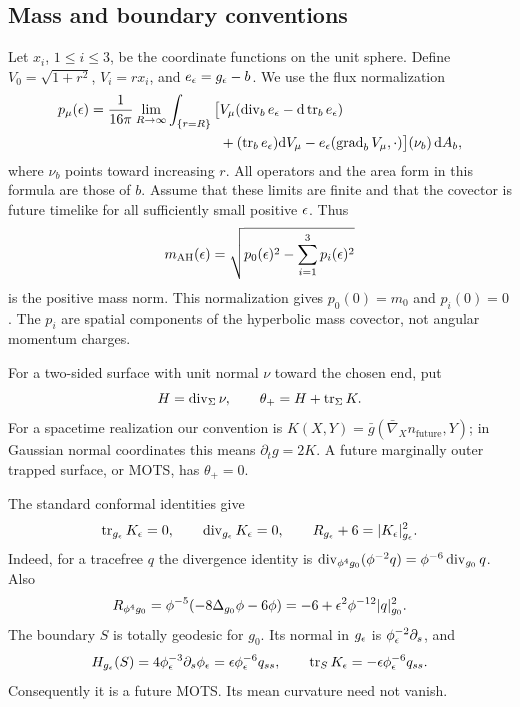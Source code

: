 \subsection{Mass and boundary conventions}

Let $x_i$, $1\leq i\leq3$, be the coordinate functions on the unit
sphere. Define $V_0=\sqrt{1+r^2}$, $V_i=rx_i$, and
$e_\epsilon=g_\epsilon-b$. We use the flux normalization
\begin{equation}\label{eq:mass-flux}
\begin{split}
 p_\mu(\epsilon)=\frac1{16\pi}\lim_{R\to\infty}
 \int_{\{r=R\}}\big[
 &V_\mu(\operatorname{div}_b e_\epsilon-\mathrm{d}\operatorname{tr}_b e_\epsilon)\\
 &+(\operatorname{tr}_b e_\epsilon)\mathrm{d} V_\mu
      -e_\epsilon(\operatorname{grad}_bV_\mu,\cdot)
 \big](\nu_b)\,\mathrm{d} A_b ,
\end{split}
\end{equation}
where $\nu_b$ points toward increasing $r$. All operators and the
area form in this formula are those of $b$. Assume that these
limits are finite and that the covector is future timelike for
all sufficiently small positive $\epsilon$. Thus
\[
 m_{\mathrm{AH}}(\epsilon)=\sqrt{p_0(\epsilon)^2-\sum_{i=1}^3p_i(\epsilon)^2}
\]
is the positive mass norm. This normalization gives $p_0(0)=m_0$
and $p_i(0)=0$. The $p_i$ are spatial components of the hyperbolic
mass covector, not angular momentum charges.

For a two-sided surface with unit normal $\nu$ toward the chosen
end, put
\[
 H=\operatorname{div}_\Sigma\nu,\qquad
 \theta_+=H+\operatorname{tr}_\Sigma K.
\]
For a spacetime realization our convention is
$K(X,Y)=\bar g(\bar\nabla_Xn_{\mathrm{future}},Y)$;
in Gaussian normal coordinates this means $\partial_tg=2K$.
A future marginally outer trapped surface, or MOTS, has
$\theta_+=0$.

The standard conformal identities give
\begin{equation}\label{eq:constraints}
 \operatorname{tr}_{g_\epsilon}K_\epsilon=0,\qquad
 \operatorname{div}_{g_\epsilon}K_\epsilon=0,\qquad
 R_{g_\epsilon}+6=|K_\epsilon|_{g_\epsilon}^2.
\end{equation}
Indeed, for a tracefree $q$ the divergence identity is
$\operatorname{div}_{\phi^4g_0}(\phi^{-2}q)=\phi^{-6}\operatorname{div}_{g_0}q$.
Also
\[
 R_{\phi^4g_0}
 =\phi^{-5}(-8\Delta_{g_0}\phi-6\phi)
 =-6+\epsilon^2\phi^{-12}|q|_{g_0}^2.
\]
The boundary $S$ is totally geodesic for $g_0$.
Its normal in $g_\epsilon$ is $\phi_\epsilon^{-2}\partial_s$, and
\begin{equation}\label{eq:boundary-mots}
 H_{g_\epsilon}(S)=4\phi_\epsilon^{-3}\partial_s\phi_\epsilon
       =\epsilon\phi_\epsilon^{-6}q_{ss},\qquad
 \operatorname{tr}_SK_\epsilon=-\epsilon\phi_\epsilon^{-6}q_{ss}.
\end{equation}
Consequently it is a future MOTS. Its mean curvature need not vanish.

